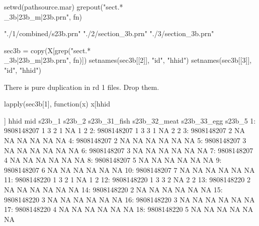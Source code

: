 \begin{Schunk}
\begin{Sinput}
setwd(pathsource.mar)
grepout("sect.*\\_3b|23b_m|23b.prn", fn)
\end{Sinput}
\begin{Soutput}
[1] "./1/combined/s23b.prn" "./2/section_3b.prn"    "./3/section_3b.prn"   
\end{Soutput}
\begin{Sinput}
sec3b = copy(X[grep("sect.*\\_3b|23b_m|23b.prn", fn)])
setnames(sec3b[[2]], "id", "hhid")
setnames(sec3b[[3]], "id", "hhid")
\end{Sinput}
\end{Schunk}
There is pure duplication in rd 1 files. Drop them.
\begin{Schunk}
\begin{Sinput}
lapply(sec3b[1], 
	function(x) x[hhid %in% x[duplicated(x[, .(hhid, mid)]), hhid], ])
\end{Sinput}
\begin{Soutput}
[[1]]
          hhid mid s23b_1 s23b_2 s23b_31_fish s23b_32_meat s23b_33_egg s23b_5
 1: 9808148207   1      3      2            1           NA           1      2
 2: 9808148207   1      3      3            1           NA           2      2
 3: 9808148207   2     NA     NA           NA           NA          NA     NA
 4: 9808148207   2     NA     NA           NA           NA          NA     NA
 5: 9808148207   3     NA     NA           NA           NA          NA     NA
 6: 9808148207   3     NA     NA           NA           NA          NA     NA
 7: 9808148207   4     NA     NA           NA           NA          NA     NA
 8: 9808148207   5     NA     NA           NA           NA          NA     NA
 9: 9808148207   6     NA     NA           NA           NA          NA     NA
10: 9808148207   7     NA     NA           NA           NA          NA     NA
11: 9808148220   1      3      2            1           NA           1      2
12: 9808148220   1      3      3            2           NA           2      2
13: 9808148220   2     NA     NA           NA           NA          NA     NA
14: 9808148220   2     NA     NA           NA           NA          NA     NA
15: 9808148220   3     NA     NA           NA           NA          NA     NA
16: 9808148220   3     NA     NA           NA           NA          NA     NA
17: 9808148220   4     NA     NA           NA           NA          NA     NA
18: 9808148220   5     NA     NA           NA           NA          NA     NA

\end{Soutput}
\end{Schunk}
